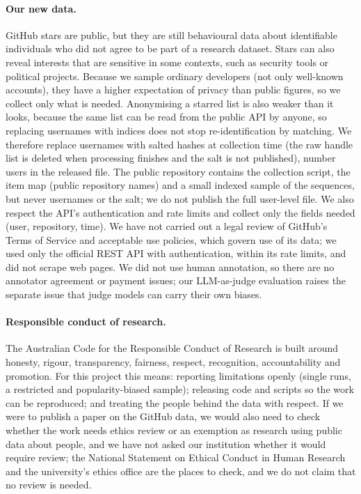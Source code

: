 \documentclass[11pt]{article}
\begin{document}
\paragraph{Our new data.}
GitHub stars are public, but they are still behavioural data about identifiable
individuals who did not agree to be part of a research dataset. Stars can also
reveal interests that are sensitive in some contexts, such as security tools or
political projects. Because we sample ordinary developers
(not only well-known accounts), they have a higher expectation of privacy than public
figures, so we collect only what is needed. Anonymising a starred list is
also weaker than it looks, because the same list can be read from the public API
by anyone, so replacing usernames with indices does not stop re-identification by
matching. We therefore replace usernames with salted hashes at collection time (the
raw handle list is deleted when processing finishes and the salt is not published),
number users in the released file. The public repository contains the collection script, the item map (public repository names) and a small indexed sample of the sequences, but never usernames or the salt; we do not publish the full user-level file. We also respect the API's authentication and rate limits and
collect only the fields needed (user, repository, time). We have not carried out a legal review of GitHub's Terms of Service and acceptable use policies, which govern use of its data; we used only the official REST API with authentication, within its rate limits, and did not scrape web pages. We did not use human annotation, so there are no
annotator agreement or payment issues; our LLM-as-judge evaluation raises the
separate issue that judge models can carry their own biases.

\paragraph{Responsible conduct of research.}
The Australian Code for the Responsible Conduct of Research
\citep{nhmrc2018code} is built around honesty, rigour, transparency, fairness,
respect, recognition, accountability and promotion. For this project this means:
reporting limitations openly (single runs, a restricted and popularity-biased
sample); releasing code and scripts so the work can be reproduced; and treating
the people behind the data with respect. If we were to publish a paper on the
GitHub data, we would also need to check whether the work needs ethics review
or an exemption as research using public data about people, and we have not asked our institution whether it would require review; the National Statement on Ethical Conduct in Human Research and the university's ethics office are the places to check, and we do not claim that no review is needed.
\end{document}
